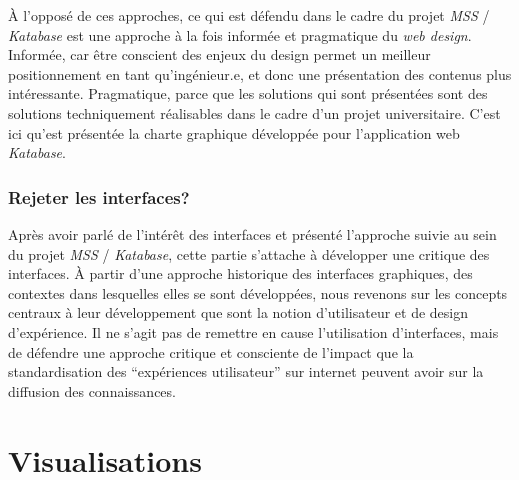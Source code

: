 \documentclass[a4paper, 12pt, twoside]{book}
\newcommand{\ktb}{\textit{Katabase}}
\newcommand{\mss}{\textit{MSS}}
\newcommand{\mssktb}{\mss{} / \ktb{}}
\newcommand{\tei}{\texttt{TEI}}
\begin{document}
À l'opposé de ces approches, ce qui est défendu dans le cadre du projet \mssktb{} est une approche à la fois informée et pragmatique du \textit{web design}. Informée, car être conscient des enjeux du design permet un meilleur positionnement en tant qu'ingénieur.e, et donc une présentation des contenus plus intéressante. Pragmatique, parce que les solutions qui sont présentées sont des solutions techniquement réalisables dans le cadre d'un projet universitaire. C'est ici qu'est présentée la charte graphique développée pour l'application web \ktb{}.

\subsection{Rejeter les interfaces?}
Après avoir parlé de l'intérêt des interfaces et présenté l'approche suivie au sein du projet \mssktb{}, cette partie s'attache à développer une critique des interfaces. À partir d'une approche historique des interfaces graphiques, des contextes dans lesquelles elles se sont développées, nous revenons sur les concepts centraux à leur développement que sont la notion d'utilisateur et de design d'expérience. Il ne s'agit pas de remettre en cause l'utilisation d'interfaces, mais de défendre une approche critique et consciente de l'impact que la standardisation des \enquote{expériences utilisateur} sur internet peuvent avoir sur la diffusion des connaissances.

\chapter{Visualisations}


\end{document}
